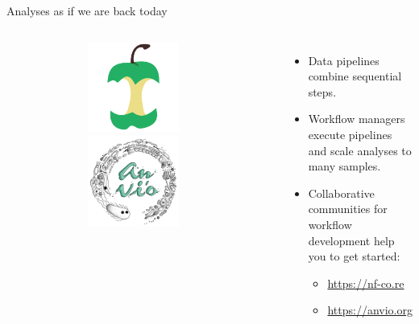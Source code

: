 \documentclass[10pt]{beamer}
\begin{document}
\begin{frame}{Analyses as if we are back today}
\begin{columns}[T]
\begin{figure}
		\end{figure}
		\includegraphics[width=0.493\textwidth]{./additional_graphics/nfcore.png}
		\includegraphics[width=0.493\textwidth]{./additional_graphics/anvio.png}
		\begin{itemize}
			\item Data pipelines combine sequential steps.
			\item Workflow managers execute pipelines and scale analyses to many samples.
			\item Collaborative communities for workflow development help you to get started:
			\begin{itemize}
				\item \url{https://nf-co.re}
				\item \url{https://anvio.org}
			\end{itemize} 
		\end{itemize}
	\end{columns}
\end{frame}
\end{document}
